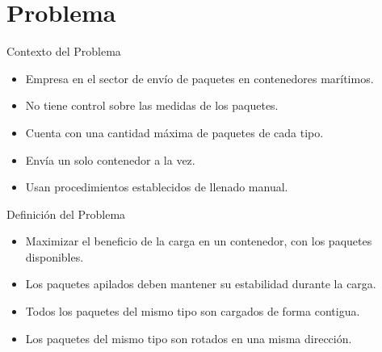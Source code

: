 \documentclass[handout]{beamer}
\begin{document}
\section{Problema}

\begin{frame}{Contexto del Problema}
    \begin{itemize}[<+-| alert@+>]
        \item Empresa en el sector de envío de paquetes en contenedores marítimos.
        \item No tiene control sobre las medidas de los paquetes.
        \item Cuenta con una cantidad máxima de paquetes de cada tipo.
        \item Envía un solo contenedor a la vez.
        \item Usan procedimientos establecidos de llenado manual.
    \end{itemize}
\end{frame}

\begin{frame}{Definición del Problema}
    \begin{itemize}[<+-| alert@+>]
        \item Maximizar el beneficio de la carga en un contenedor, con los paquetes disponibles.
        \item Los paquetes apilados deben mantener su estabilidad durante la carga.
        \item Todos los paquetes del mismo tipo son cargados de forma contigua.
        \item Los paquetes del mismo tipo son rotados en una misma dirección.
    \end{itemize}
\end{frame}
\end{document}
